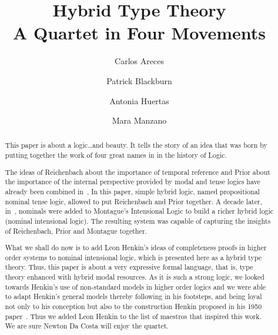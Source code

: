 \documentclass[11pt]{article}
\begin{document}
\title{Hybrid Type Theory\\ A Quartet in Four Movements}
\author{Carlos Areces \\
\and
Patrick Blackburn
\and
Antonia Huertas
\and 
Mara Manzano
}
\date{}
\maketitle

\begin{abstract}
This paper is about a logic\ldots and beauty. It tells the story of an idea that 
was born by putting together the work of four great names in in the history of 
Logic. 

The ideas of Reichenbach about the importance of temporal reference and
Prior about the importance of the internal perspective provided by modal and
tense logics have already been combined in~\cite{Blackburn1994}, In this
paper, simple hybrid logic, named propositional nominal tense logic, allowed
to put Reichenbach and Prior together. A decade later, in~\cite{ArecesBlackburn2005}, nominals were added to Montague's Intensional Logic to build
a richer hybrid logic (nominal intensional logic). The resulting system was
capable of capturing the insights of Reichenbach, Prior and Montague together.

What we shall do now is to add Leon Henkin's ideas of completeness proofs in
higher order systems to nominal intensional logic, which is presented here
as a hybrid type theory. Thus, this paper is about a very expressive formal
language, that is, type theory enhanced with hybrid modal resources. 
As it is such a strong logic,
we looked towards Henkin's use of non-standard models in higher order logics
and we were able to adapt Henkin's general models thereby following in his
footsteps, and being loyal not only to his conception but also to the
construction Henkin proposed in his 1950 paper~\cite{Henkin1950}. Thus we
added Leon Henkin to the list of maestros that inspired this work.
We are sure Newton Da Costa will enjoy the quartet.
\end{abstract}

\begin{small}
\tableofcontents
\end{small}






 

\end{document}
